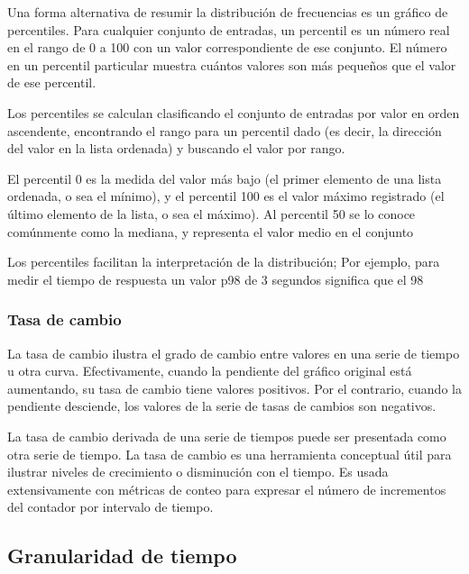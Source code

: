Una forma alternativa de resumir la distribución de frecuencias es un gráfico de percentiles. Para cualquier conjunto de entradas, un percentil es un número real en el rango de 0 a 100 con un valor correspondiente de ese conjunto. El número en un percentil particular muestra cuántos valores son más pequeños que el valor de ese percentil.

Los percentiles se calculan clasificando el conjunto de entradas por valor en orden ascendente, encontrando el rango para un percentil dado (es decir, la dirección del valor en la lista ordenada) y buscando el valor por rango.

El percentil 0 es la medida del valor más bajo (el primer elemento de una lista ordenada, o sea el mínimo), y el percentil 100 es el valor máximo registrado (el último elemento de la lista, o sea el máximo). Al percentil 50 se lo conoce comúnmente como la mediana, y representa el valor medio en el conjunto

Los percentiles facilitan la interpretación de la distribución; Por ejemplo, para medir el tiempo de respuesta un valor p98 de 3 segundos significa que el 98%

\subsubsection*{Tasa de cambio}
\label{tasa_de_cambio}

La tasa de cambio ilustra el grado de cambio entre valores en una serie de tiempo u otra curva. Efectivamente, cuando la pendiente del gráfico original está aumentando, su tasa de cambio tiene valores positivos. Por el contrario, cuando la pendiente desciende, los valores de la serie de tasas de cambios son negativos.

La tasa de cambio derivada de una serie de tiempos puede ser presentada como otra serie de tiempo. La tasa de cambio es una herramienta conceptual útil para ilustrar niveles de crecimiento o disminución con el tiempo. Es usada extensivamente con métricas de conteo para expresar el número de incrementos del contador por intervalo de tiempo.


\subsection*{Granularidad de tiempo}
\label{granularidad_de_tiempo}

